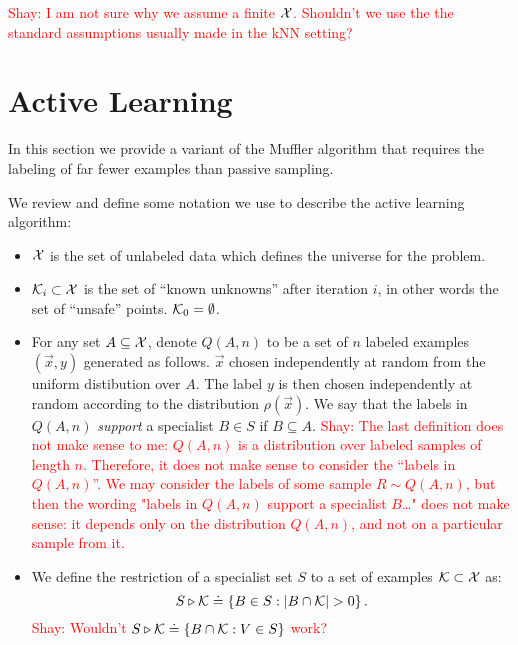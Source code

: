 \documentclass{article}
\newcommand{\X}{{\cal X}}
\newcommand{\x}{\vec{x}}
\newcommand{\K}{{\cal K}}
\newcommand{\restrictedto}{\triangleright}
\newcommand{\shay}[1]{\textcolor{red}{Shay: #1}}
\begin{document}
\shay{I am not sure why we assume a finite $\X$. 
Shouldn't we use the the standard assumptions usually made in the kNN setting?}

\iffalse
Our analysis consists of two parts:
\begin{itemize}
\item {\bf Sampling and convergence:} In this part we use large
  deviation bounds to compute a confidence interval for the bias of
  each ball. The length of the confidence interval is not uniform and
  is a function of the number of examples
  
\end{itemize}
\fi

\section{Active Learning}

In this section we provide a variant of the Muffler algorithm that
requires the labeling of far fewer examples than passive sampling.

We review and define some notation we use to describe the active learning algorithm: 

\begin{itemize}
\item $\X$ is the set of unlabeled data which defines the
  universe for the problem.
\item $\K_i \subset \X$ is the set of ``known unknowns'' after iteration $i$, in
  other words the set of ``unsafe'' points. $\K_0=\emptyset$.
\item For any set $A\subseteq \X$, denote $Q(A,n)$ to be a set of
  $n$ labeled examples $(\x,y)$ generated as follows. $\x$ chosen
  independently at random from the uniform distibution over
  $A$. The label $y$ is then chosen independently at random according
  to the distribution $\rho(\x)$. We say that the
  labels in $Q(A,n)$ {\em support} a specialist $B \in S$ if $B
  \subseteq A$.
  \shay{The last definition does not make sense to me:
  $Q(A,n)$ is a distribution over labeled samples of length $n$.
  Therefore, it does not make sense to consider the ``labels in $Q(A,n)$''.
  We may consider the labels of some sample $R\sim Q(A,n)$,
  but then the wording "labels in $Q(A,n)$ support a specialist $B$\ldots"
  does not make sense: it depends only on the distribution $Q(A,n)$, and
  not on a particular sample from it.
  }
\item We define the restriction of a specialist set $S$ to a set of
  examples $\K \subset \X$ as:
  $$
  S \restrictedto \K \doteq \left\{ B \in S : | B \cap \K | > 0 \right\}.
  $$
  \shay{Wouldn't $S \restrictedto \K \doteq \left\{ B \cap \K : V\in S \right\}$ work?}
\end{itemize}
\end{document}
